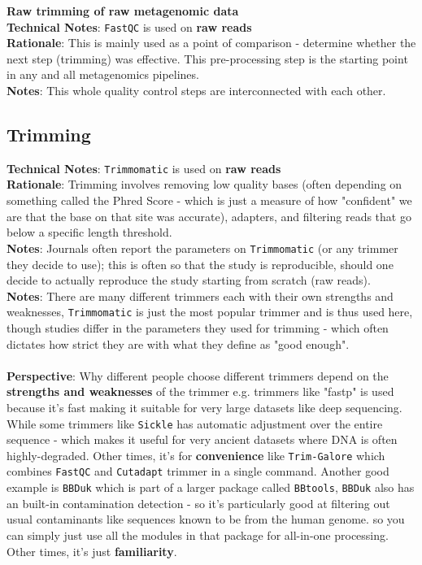 \documentclass[11pt]{report}
\begin{document}
\textbf{Raw trimming of raw metagenomic data} 
\\ \textbf{Technical Notes}: \texttt{FastQC} is used on \textbf{raw reads}
\\ \textbf{Rationale}: This is mainly used as a point of comparison - determine whether the next step (trimming) was effective. This pre-processing step is the starting point in any and all metagenomics pipelines. 
\\ \textbf{Notes}: This whole quality control steps are interconnected with each other. 
\subsection{Trimming} 
\textbf{Technical Notes}: \texttt{Trimmomatic} is used on \textbf{raw reads}
\\ \textbf{Rationale}: Trimming involves removing low quality bases (often depending on something called the Phred Score - which is just a measure of how "confident" we are that the base on that site was accurate), adapters, and filtering reads that go below a specific length threshold. 
\\ \textbf{Notes}: Journals often report the parameters on \texttt{Trimmomatic} (or any trimmer they decide to use); this is often so that the study is reproducible, should one decide to actually reproduce the study starting from scratch (raw reads). 
\\ \textbf{Notes}: There are many different trimmers each with their own strengths and weaknesses, \texttt{Trimmomatic} is just the most popular trimmer and is thus used here, though studies differ in the parameters they used for trimming - which often dictates how strict they are with what they define as "good enough". \\
\\ \textbf{Perspective}: Why different people choose different trimmers depend on the \textbf{strengths and weaknesses} of the trimmer e.g. trimmers like "fastp" is used because it's fast making it suitable for very large datasets like deep sequencing. While some trimmers like \texttt{Sickle} has automatic adjustment over the entire sequence - which makes it useful for very ancient datasets where DNA is often highly-degraded. Other times, it's for \textbf{convenience} like \texttt{Trim-Galore} which combines \texttt{FastQC} and \texttt{Cutadapt} trimmer in a single command. Another good example is \texttt{BBDuk} which is part of a larger package called \texttt{BBtools}, \texttt{BBDuk} also has an built-in contamination detection - so it's particularly good at filtering out usual contaminants like sequences known to be from the human genome. so you can simply just use all the modules in that package for all-in-one processing.  Other times, it's just \textbf{familiarity}. 
\end{document}
